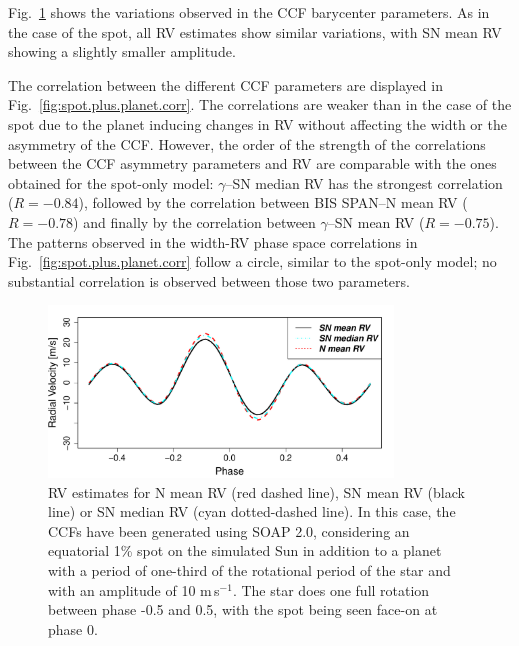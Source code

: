 \documentclass{aa}
\def\ms{\hbox{\,m\,s$^{-1}$}}         %
\begin{document}
Fig.~\ref{fig:spot.plus.planet} shows the variations observed in the CCF barycenter parameters. As in the case of the spot, all RV estimates show similar variations, with SN mean RV showing a slightly smaller amplitude.

The correlation between the different CCF parameters are displayed in Fig.~\ref{fig:spot.plus.planet.corr}. 
The correlations are weaker than in the case of the spot due to the planet inducing changes in RV without affecting the width or the asymmetry of the CCF.  However, the order of the strength of the correlations between the CCF asymmetry parameters and RV are comparable with the ones obtained for the spot-only model: $\gamma$--SN median RV has the strongest correlation ($R=-0.84$), followed by the correlation between BIS SPAN--N mean RV ($R=-0.78$) and finally by the correlation between $\gamma$--SN mean RV ($R=-0.75$). 
The patterns observed in the width-RV phase space correlations in Fig.~\ref{fig:spot.plus.planet.corr} follow a circle, similar to the spot-only model; no substantial correlation is observed between those two parameters.

\begin{figure}[htbp]
\begin{center}
\includegraphics[width = 3.6in]{RV_comparison_SPOT_PLANET.pdf} 
 \caption{RV estimates for N mean RV (red dashed line),  SN mean RV (black line) or SN median RV (cyan dotted-dashed line). In this case, the CCFs have been generated using SOAP 2.0, considering an equatorial 1\% spot on the simulated Sun in addition to a planet with a period of one-third of the rotational period of the star and with an amplitude of 10\,\ms. The star does one full rotation between phase -0.5 and 0.5, with the spot being seen face-on at phase 0.}
    \label{fig:spot.plus.planet}
\end{center}
\end{figure}
\end{document}
